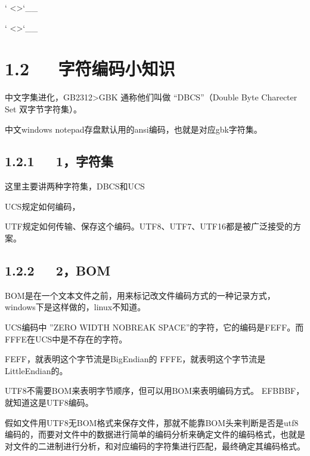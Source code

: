 \documentclass[letterpaper,12pt,english]{sphinxmanual}
\begin{document}


` <>`\_\_

` <>`\_\_


\section{1.2   字符编码小知识}
\label{\detokenize{004.study/001._u7f16_u7a0b/_u5b57_u7b26_u6587_u4ef6_u7f16_u7801:id3}}
中文字集进化，GB2312\sphinxhyphen{}>GBK 通称他们叫做 “DBCS”（Double Byte Charecter Set 双字节字符集）。

中文windows notepad存盘默认用的ansi编码，也就是对应gbk字符集。


\subsection{1.2.1   1，字符集}
\label{\detokenize{004.study/001._u7f16_u7a0b/_u5b57_u7b26_u6587_u4ef6_u7f16_u7801:id4}}
这里主要讲两种字符集，DBCS和UCS

UCS规定如何编码，

UTF规定如何传输、保存这个编码。UTF8、UTF7、UTF16都是被广泛接受的方案。


\subsection{1.2.2   2，BOM}
\label{\detokenize{004.study/001._u7f16_u7a0b/_u5b57_u7b26_u6587_u4ef6_u7f16_u7801:bom}}
BOM是在一个文本文件之前，用来标记改文件编码方式的一种记录方式，windows下是这样做的，linux不知道。

UCS编码中 ”ZERO WIDTH NO\sphinxhyphen{}BREAK SPACE”的字符，它的编码是FEFF。而FFFE在UCS中是不存在的字符。

FEFF，就表明这个字节流是Big\sphinxhyphen{}Endian的
FFFE，就表明这个字节流是Little\sphinxhyphen{}Endian的。

UTF8不需要BOM来表明字节顺序，但可以用BOM来表明编码方式。
EFBBBF，就知道这是UTF8编码。

假如文件用UTF8无BOM格式来保存文件，那就不能靠BOM头来判断是否是utf8编码的，而要对文件中的数据进行简单的编码分析来确定文件的编码格式，也就是对文件的二进制进行分析，和对应编码的字符集进行匹配，最终确定其编码格式。
\end{document}
